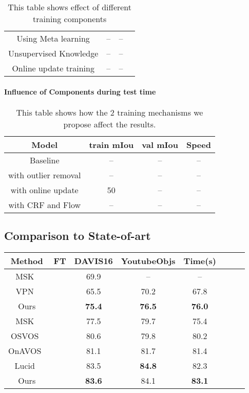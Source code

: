 \documentclass[10pt,twocolumn,letterpaper]{article}
\newcommand{\xmark}{\ding{55}}%
\begin{document}
\begin{table}[t]
\begin{tabular}{|c|c|c|c|}
    Using Meta learning     & --            & --  \\
    Unsupervised Knowledge  & --            & --  \\
    Online update training  & --            & --  \\
    \hline
    \end{tabular}
    \caption{This table shows effect of different training components}
    \label{tab:unsup_training}
\end{table}\paragraph{Influence of Components during test time}\begin{table}[t]
    \centering
    \small
    \begin{tabular}{|c|c|c|c|}
    \hline
    Model                   & train mIou    & val mIou & Speed\\ \hline
    \hline
    Baseline                & --            & --        & --\\
    with outlier removal    & --            & --        & --\\
    with online update      & 50            & --        & --\\
    with CRF and Flow       & --            & --        & --\\
    \hline
    \end{tabular}
    \caption{This table shows how the 2 training mechanisms we propose affect the results.}
    \label{tab:unsup_training}
\end{table}\subsection{Comparison to State-of-art}%
    \centering
    \small
	\begin{tabular}{|ccccc|ccc|}
	    \hline
		Method & FT & DAVIS16 & YoutubeObjs & Time(s)\\ \hline
		\hline
		MSK~\cite{masktrack}&\xmark & 69.9      & --        & --\\
		VPN~\cite{vpn}      &\xmark & 65.5      &70.2       &67.8 \\
		Ours                &\xmark &{\bf 75.4} &{\bf 76.5} &{\bf 76.0} \\
		MSK~\cite{masktrack}&\xmark & 77.5      &79.7       &75.4 \\
		OSVOS~\cite{OSVOS}  &\xmark & 80.6      &79.8       &80.2 \\
        OnAVOS~\cite{onavos}&\xmark & 81.1      &81.7       &81.4 \\
		Lucid~\cite{lucid}  &\xmark & 83.5      &{\bf 84.8} &82.3 \\
		\hline
		\hline
	    Ours                &\xmark &{\bf 83.6} &84.1       &{\bf 83.1} \\
	    \hline
	\end{tabular}
\end{document}
